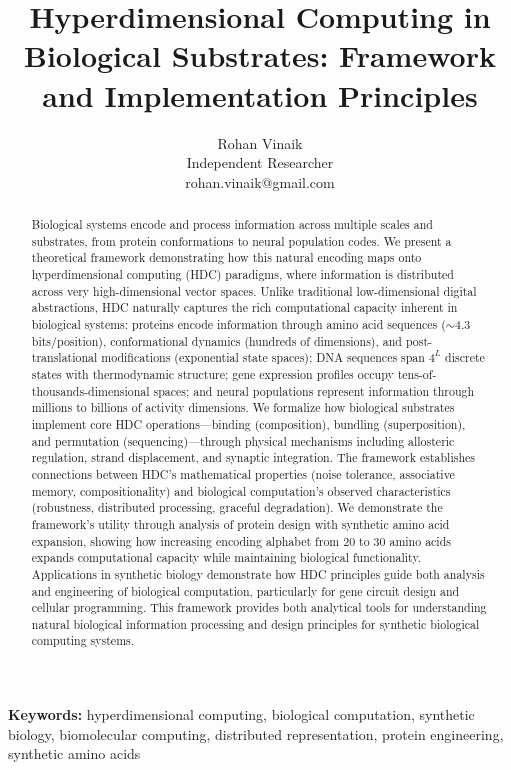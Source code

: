 \documentclass[12pt]{article}
\title{\textbf{Hyperdimensional Computing in Biological Substrates: Framework and Implementation Principles}}
\author{Rohan Vinaik\\
\small Independent Researcher\\
\small rohan.vinaik@gmail.com}
\date{}
\begin{document}
\maketitle

\begin{abstract}
Biological systems encode and process information across multiple scales and substrates, from protein conformations to neural population codes. We present a theoretical framework demonstrating how this natural encoding maps onto hyperdimensional computing (HDC) paradigms, where information is distributed across very high-dimensional vector spaces. Unlike traditional low-dimensional digital abstractions, HDC naturally captures the rich computational capacity inherent in biological systems: proteins encode information through amino acid sequences ($\sim$4.3 bits/position), conformational dynamics (hundreds of dimensions), and post-translational modifications (exponential state spaces); DNA sequences span $4^L$ discrete states with thermodynamic structure; gene expression profiles occupy tens-of-thousands-dimensional spaces; and neural populations represent information through millions to billions of activity dimensions. We formalize how biological substrates implement core HDC operations—binding (composition), bundling (superposition), and permutation (sequencing)—through physical mechanisms including allosteric regulation, strand displacement, and synaptic integration. The framework establishes connections between HDC's mathematical properties (noise tolerance, associative memory, compositionality) and biological computation's observed characteristics (robustness, distributed processing, graceful degradation). We demonstrate the framework's utility through analysis of protein design with synthetic amino acid expansion, showing how increasing encoding alphabet from 20 to 30 amino acids expands computational capacity while maintaining biological functionality. Applications in synthetic biology demonstrate how HDC principles guide both analysis and engineering of biological computation, particularly for gene circuit design and cellular programming. This framework provides both analytical tools for understanding natural biological information processing and design principles for synthetic biological computing systems.
\end{abstract}

\noindent\textbf{Keywords:} hyperdimensional computing, biological computation, synthetic biology, biomolecular computing, distributed representation, protein engineering, synthetic amino acids
\end{document}

